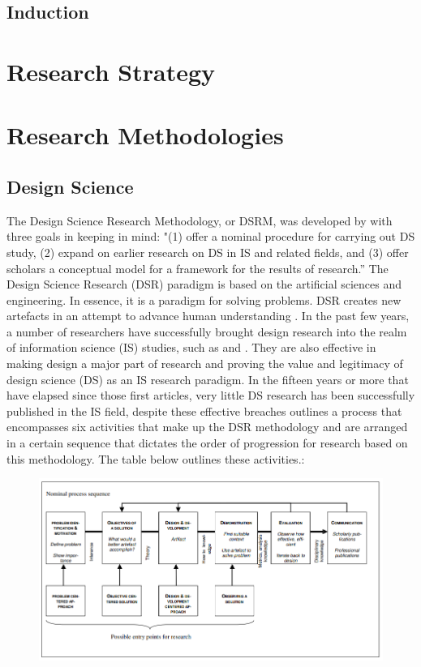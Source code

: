 {{\subsection{Induction}


\section{Research Strategy}


\section{Research Methodologies}
\subsection{Design Science}
\par{The Design Science Research Methodology, or DSRM, was developed by \cite{peffers2007design} with three goals in keeping in mind: "(1) offer a nominal procedure for carrying out DS study, (2) expand on earlier research on DS in IS and related fields, and (3) offer scholars a conceptual model for a framework for the results of research.” The Design Science Research (DSR) paradigm is based on the artificial sciences and engineering. In essence, it is a paradigm for solving problems. DSR creates new artefacts in an attempt to advance human understanding \citep{hevner2010design}. In the past few years, a number of researchers have successfully brought design research into the realm of information science (IS) studies, such as \cite{hevner2004design} and \cite{walls1992building}. They are also effective in making design a major part of research and proving the value and legitimacy of design science (DS) as an IS research paradigm. In the fifteen years or more that have elapsed since those first articles, very little DS research has been successfully published in the IS field, despite these effective breaches \citep{peffers2007design} outlines a process that encompasses six activities that make up the DSR methodology and are arranged in a certain sequence that dictates the order of progression for research based on this methodology. The table below outlines these activities.:}
\clearpage
\begin{figure}[h!]
    \centering
    \includegraphics[width=1\linewidth]{img/Design science research process (DSRP) model.png}

\end{figure}}}
